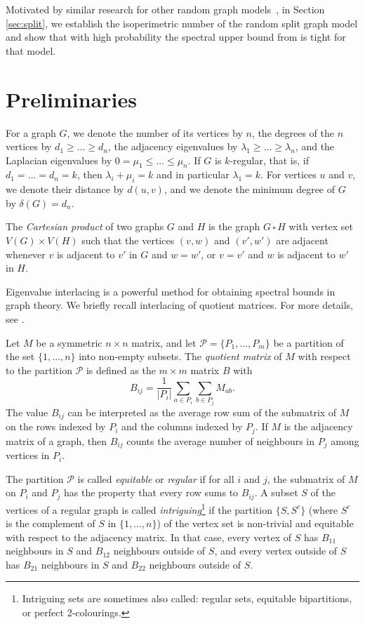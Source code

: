 \documentclass[a4paper,11pt]{article}
\theoremstyle{definition}
\newcommand{\cartesianproduct}{\,\square\,}
\begin{document}
Motivated by similar research for other random graph models~\cite{Bollobas1988, Alon1986,BHKL2008}, in Section \ref{sec:split}, we establish the isoperimetric number of the random split graph model and show that with high probability the spectral upper bound from \cite{AFHP2014} is tight for that model.




\section{Preliminaries}

For a graph $G$, we denote the number of its vertices by $n$, the degrees of the $n$ vertices by $d_1\ge \dots \ge d_n$, the adjacency eigenvalues by $\lambda_1\geq\dots \geq\lambda_n$, and the Laplacian eigenvalues by $0=\mu_1\leq\dots\leq\mu_n$.
If \(G\) is \(k\)-regular, that is, if \(d_1=\dots=d_n=k\), then \(\lambda_i+\mu_i=k\) and in particular \(\lambda_1=k\).
For vertices $u$ and $v$, we denote their distance by $d(u,v)$, and we denote the minimum degree of $G$ by $\delta(G)=d_n$.

The \emph{Cartesian product} of two graphs $G$ and $H$ is the graph $G \cartesianproduct H$ with vertex set $V(G) \times V(H)$ such that the vertices $(v,w)$ and $ (v',w')$ are adjacent whenever $v$ is adjacent to $v'$ in $G$ and $w = w'$, or $v = v'$ and $w$ is adjacent to $w'$ in $H$.

Eigenvalue interlacing is a powerful method for obtaining spectral bounds in graph theory. We briefly recall interlacing of quotient matrices. For more details, see \cite[Sections 2.3 and 2.5]{spectra}.

Let $M$ be a symmetric $n\times n$ matrix, and let $\mathcal P=\{P_1,\dots,P_m\} $ be a partition of the set $\{1,\dots, n\}$ into non-empty subsets. The \emph{quotient matrix} of $M$ with respect to the partition $\mathcal P$ is defined as the $m\times m$ matrix $B$ with
$$B_{ij}=\frac1{|P_i|} \sum_{a \in P_i}\sum_{b\in P_j} M_{ab}.$$
The value $B_{ij}$ can be interpreted as the average row sum of the submatrix of $M$ on the rows indexed by $P_i$ and the columns indexed by $P_j$. If $M$ is the adjacency matrix of a graph, then $B_{ij}$ counts the average number of neighbours in $P_j$ among vertices in $P_i$.

The partition $\mathcal P$ is called \emph{equitable} or \emph{regular} if for all $i$ and $j$, the submatrix of $M$ on $P_i$ and $P_j$ has the property that every row sums to $B_{ij}$. A subset $S$ of the vertices of a regular graph is called \emph{intriguing}\footnote{Intriguing sets are sometimes also called: regular sets, equitable bipartitions, or perfect 2-colourings.} if the partition $\{S,S^c\}$ (where $S^c$ is the complement of $S$ in $\{1,\dots,n\}$) of the vertex set is non-trivial and equitable with respect to the adjacency matrix. In that case, every vertex of $S$ has $B_{11}$ neighbours in $S$ and $B_{12}$ neighbours outside of $S$, and every vertex outside of $S$ has $B_{21}$ neighbours in $S$ and $B_{22}$ neighbours outside of $S$.
\end{document}
